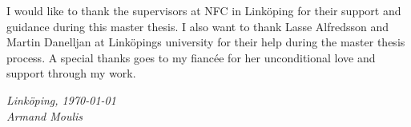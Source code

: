 \begin{acknowledgments}

I would like to thank the supervisors at NFC in Linköping for their support and guidance during this master thesis. I also want to thank Lasse Alfredsson and Martin Danelljan at Linköpings university for their help during the master thesis process. A special thanks goes to my fiancée for her unconditional love and support through my work. 

  \addvspace{1em}
  \begin{flushright}
    \textit{%
      Linköping, \today \\
      Armand Moulis%
    }
  \end{flushright}
\end{acknowledgments}
